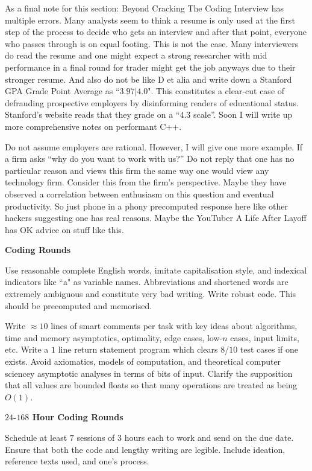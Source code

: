 As a final note for this section: Beyond Cracking The Coding Interview has multiple errors. Many analysts seem to think a resume is only used at the first step of the process to decide who gets an interview and after that point, everyone who passes through is on equal footing. This is not the case. Many interviewers do read the resume and one might expect a strong researcher with mid performance in a final round for trader might get the job anyways due to their stronger resume. And also do not be like D et alia and write down a Stanford GPA Grade Point Average as ``$3.97|4.0$". This constitutes a clear-cut case of defrauding prospective employers by disinforming readers of educational status. Stanford's website reads that they grade on a ``$4.3$ scale''. Soon I will write up more comprehensive notes on performant C++.

Do not assume employers are rational. However, I will give one more example. If a firm asks ``why do you want to work with us?'' Do not reply that one has no particular reason and views this firm the same way one would view any technology firm. Consider this from the firm's perspective. Maybe they have observed a correlation between enthusiasm on this question and eventual productivity. So just phone in a phony precomputed response here like other hackers suggesting one has real reasons. Maybe the YouTuber A Life After Layoff has OK advice on stuff like this.

\newpage
\textbf{Coding Rounds}

Use reasonable complete English words, imitate capitalisation style, and indexical indicators like ``a" as variable names. Abbreviations and shortened words are extremely ambiguous and constitute very bad writing. Write robust code. This should be precomputed and memorised.

Write $\approx 10$ lines of smart comments per task with key ideas about algorithms, time and memory asymptotics, optimality, edge cases, low-$n$ cases, input limits, etc. Write a $1$ line return statement program which clears $8$/$10$ test cases if one exists. Avoid axiomatics, models of computation, and theoretical computer sciencey asymptotic analyses in terms of bits of input. Clarify the supposition that all values are bounded floats so that many operations are treated as being $O(1)$.

\textbf{$24$-$168$ Hour Coding Rounds}

Schedule at least $7$ sessions of $3$ hours each to work and send on the due date. Ensure that both the code and lengthy writing are legible. Include ideation, reference texts used, and one's process.

